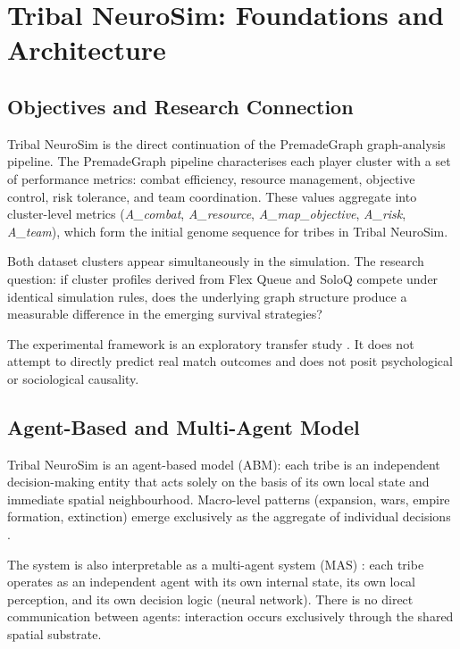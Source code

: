 \chapter{Tribal NeuroSim: Foundations and Architecture}

\section{Objectives and Research Connection}

Tribal NeuroSim is the direct continuation of the PremadeGraph graph-analysis pipeline. The PremadeGraph pipeline characterises each player cluster with a set of performance metrics: combat efficiency, resource management, objective control, risk tolerance, and team coordination. These values aggregate into cluster-level metrics (\textit{A\_combat}, \textit{A\_resource}, \textit{A\_map\_objective}, \textit{A\_risk}, \textit{A\_team}), which form the initial genome sequence for tribes in Tribal NeuroSim.

Both dataset clusters appear simultaneously in the simulation. The research question: if cluster profiles derived from Flex Queue and SoloQ compete under identical simulation rules, does the underlying graph structure produce a measurable difference in the emerging survival strategies?

The experimental framework is an exploratory transfer study \cite{bonabeau2002}. It does not attempt to directly predict real match outcomes and does not posit psychological or sociological causality.

\section{Agent-Based and Multi-Agent Model}

Tribal NeuroSim is an agent-based model (ABM): each tribe is an independent decision-making entity that acts solely on the basis of its own local state and immediate spatial neighbourhood. Macro-level patterns (expansion, wars, empire formation, extinction) emerge exclusively as the aggregate of individual decisions \cite{bonabeau2002}.

The system is also interpretable as a multi-agent system (MAS) \cite{wooldridgejennings1995}: each tribe operates as an independent agent with its own internal state, its own local perception, and its own decision logic (neural network). There is no direct communication between agents: interaction occurs exclusively through the shared spatial substrate.

